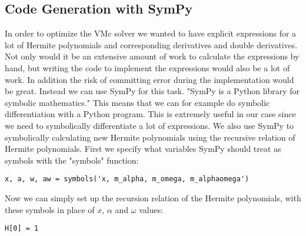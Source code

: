 \documentclass[../main.tex]{subfiles}
\begin{document}
\begin{appendices}
\chapter{Code Generation with SymPy}

In order to optimize the VMc solver we wanted to have explicit expressions for a lot of Hermite polynomials and corresponding derivatives and double derivatives. Not only would it be an extensive amount of work to calculate the expressions by hand, but writing the code to implement the expressions would also be a lot of work. In addition the risk of committing error during the implementation would be great. Instead we can use SymPy for this task. "SymPy is a Python library for symbolic mathematics."\cite{SymPy} This means that we can for example do symbolic differentiation with a Python program. This is extremely useful in our case since we need to symbolically differentiate a lot of expressions. We also use SymPy to symbolically calculating new Hermite polynomials using the recursive relation of Hermite polynomials. First we specify what variables SymPy should treat as symbols with the "symbols" function:
\lstset{language=python}
\begin{lstlisting}[caption={}]
x, a, w, aw = symbols('x, m_alpha, m_omega, m_alphaomega')
\end{lstlisting}
Now we can simply set up the recursion relation of the Hermite polynomials, with these symbols in place of $x$, $\alpha$ and $\omega$ values:
\lstset{language=python}
\begin{lstlisting}[caption={}]
H[0] = 1


\end{lstlisting}
\end{appendices}
\end{document}

